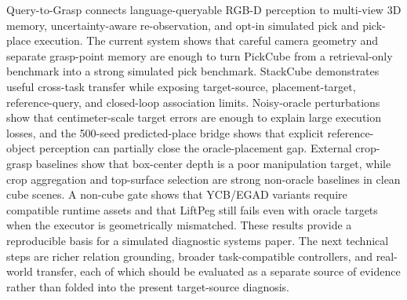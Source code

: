 \documentclass[conference]{IEEEtran}
\begin{document}
Query-to-Grasp connects language-queryable RGB-D perception to multi-view 3D
memory, uncertainty-aware re-observation, and opt-in simulated pick and
pick-place execution.
The current system shows that careful camera geometry and separate grasp-point
memory are enough to turn PickCube from a retrieval-only benchmark into a
strong simulated pick benchmark. StackCube demonstrates useful cross-task
transfer while exposing target-source, placement-target, reference-query, and
closed-loop association limits. Noisy-oracle perturbations show that
centimeter-scale target errors are enough to explain large execution losses,
and the 500-seed predicted-place bridge shows that explicit reference-object
perception can partially close the oracle-placement gap. External crop-grasp
baselines show that box-center depth is a poor manipulation target, while crop
aggregation and top-surface selection are strong non-oracle baselines in clean
cube scenes. A non-cube gate shows that YCB/EGAD variants require compatible
runtime assets and that LiftPeg still fails even with oracle targets when the
executor is geometrically mismatched. These results provide a reproducible
basis for a simulated diagnostic systems paper. The next
technical steps are richer relation grounding, broader task-compatible
controllers, and real-world transfer, each of which should be evaluated as a
separate source of evidence rather than folded into the present target-source
diagnosis.



\end{document}
